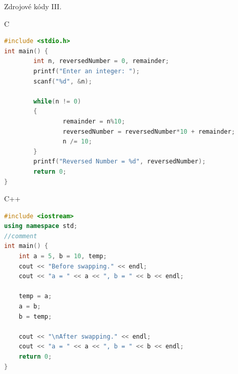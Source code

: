 \documentclass{beamer}
\begin{document}
\begin{frame}[fragile, shrink=20]{Zdrojové kódy III.}


	C
	\begin{lstlisting}[language=C]
#include <stdio.h>
int main() {
		int n, reversedNumber = 0, remainder;
		printf("Enter an integer: ");
		scanf("%d", &n);

		while(n != 0)
		{
				remainder = n%10;
				reversedNumber = reversedNumber*10 + remainder;
				n /= 10;
		}
		printf("Reversed Number = %d", reversedNumber);
		return 0;
}
\end{lstlisting}

C++
\begin{lstlisting}[language=C++]
#include <iostream>
using namespace std;
//comment 
int main() {
	int a = 5, b = 10, temp;
	cout << "Before swapping." << endl;
	cout << "a = " << a << ", b = " << b << endl;

	temp = a;
	a = b;
	b = temp;

	cout << "\nAfter swapping." << endl;
	cout << "a = " << a << ", b = " << b << endl;
	return 0;
}
\end{lstlisting}
\end{frame}
\end{document}
